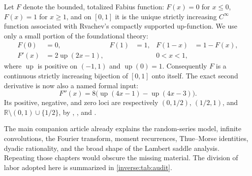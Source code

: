 \documentclass[11pt,oneside]{article}
\theoremstyle{definition}
\theoremstyle{remark}
\newcommand{\R}{\mathbb R}
\newcommand{\Up}{\operatorname{up}}
\begin{document}
Let $F$ denote the bounded, totalized Fabius function: $F(x)=0$ for
$x\leq0$, $F(x)=1$ for $x\geq1$, and on $[0,1]$ it is the unique strictly
increasing $C^\infty$ function associated with Rvachev's compactly
supported up-function.  We use only a small portion of the foundational
theory:
\begin{align}
 F(0)&=0,&F(1)&=1,&F(1-x)&=1-F(x), \label{inverse:eq:F-basic}\\
 F'(x)&=2\Up(2x-1),&&&0<x<1, \label{inverse:eq:Fprime-up}
\end{align}
where $\Up$ is positive on $(-1,1)$ and $\Up(0)=1$.  Consequently $F$ is a
continuous strictly increasing bijection of $[0,1]$ onto itself.
The exact second derivative is now also a named formal input:
\[
 F''(x)=8\bigl(\Up(4x-1)-\Up(4x-3)\bigr).
\]
Its positive, negative, and zero loci are respectively \((0,1/2)\),
\((1/2,1)\), and \(\R\setminus(0,1)\cup\{1/2\}\), by
,
, and
.

The main companion article already explains the random-series model,
infinite convolutions, the Fourier transform, moment recurrences,
Thue--Morse identities, dyadic rationality, and the broad shape of the
Lambert saddle analysis.  Repeating those chapters would obscure the
missing material.  The division of labor adopted here is summarized in
\cref{inverse:tab:audit}.
\end{document}
